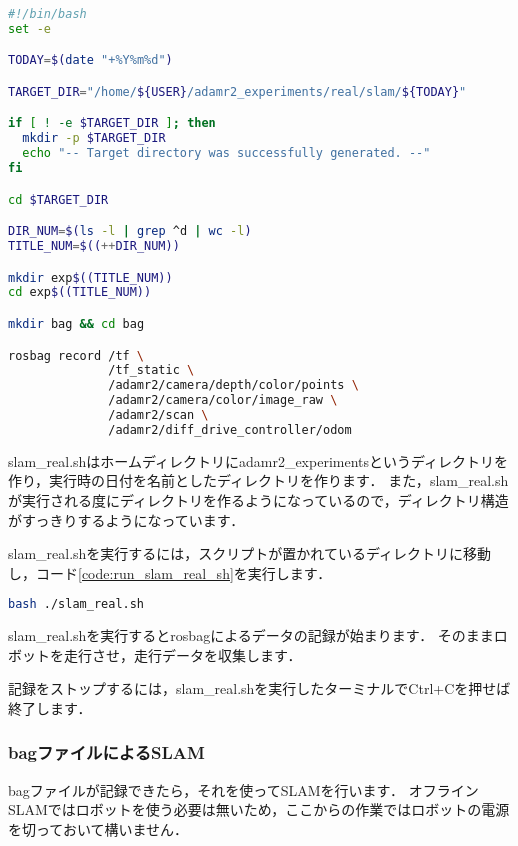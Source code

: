 \documentclass[{../../master}]{subfiles}
\begin{document}
\begin{lstlisting}[language=sh, label=code:slam_real_sh, caption=\textsf{slam\_real.sh}]
#!/bin/bash
set -e

TODAY=$(date "+%Y%m%d")

TARGET_DIR="/home/${USER}/adamr2_experiments/real/slam/${TODAY}"

if [ ! -e $TARGET_DIR ]; then
  mkdir -p $TARGET_DIR
  echo "-- Target directory was successfully generated. --"
fi

cd $TARGET_DIR

DIR_NUM=$(ls -l | grep ^d | wc -l)
TITLE_NUM=$((++DIR_NUM))

mkdir exp$((TITLE_NUM))
cd exp$((TITLE_NUM))

mkdir bag && cd bag

rosbag record /tf \
              /tf_static \
              /adamr2/camera/depth/color/points \
              /adamr2/camera/color/image_raw \
              /adamr2/scan \
              /adamr2/diff_drive_controller/odom
\end{lstlisting}

\textsf{slam\_real.sh}はホームディレクトリに\textsf{adamr2\_experiments}というディレクトリを作り，実行時の日付を名前としたディレクトリを作ります．
また，\textsf{slam\_real.sh}が実行される度にディレクトリを作るようになっているので，ディレクトリ構造がすっきりするようになっています．

\textsf{slam\_real.sh}を実行するには，スクリプトが置かれているディレクトリに移動し，コード\ref{code:run_slam_real_sh}を実行します．

\begin{lstlisting}[language=sh, label=code:run_slam_real_sh, caption=Run \textsf{slam\_real.sh}]
bash ./slam_real.sh
\end{lstlisting}

\textsf{slam\_real.sh}を実行すると\textsf{rosbag}によるデータの記録が始まります．
そのままロボットを走行させ，走行データを収集します．

記録をストップするには，\textsf{slam\_real.sh}を実行したターミナルで\textsf{Ctrl+C}を押せば終了します．

\subsubsection{bagファイルによるSLAM}

bagファイルが記録できたら，それを使ってSLAMを行います．
オフラインSLAMではロボットを使う必要は無いため，ここからの作業ではロボットの電源を切っておいて構いません．
\end{document}
